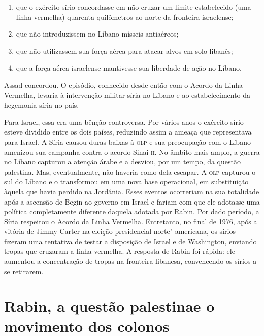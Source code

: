 \begin{enumerate}
\def\labelenumi{\arabic{enumi}.}
\item
  que o exército sírio concordasse em não cruzar um limite estabelecido
  (uma linha vermelha) quarenta quilômetros ao norte da fronteira
  israelense;
\item
  que não introduzissem no Líbano mísseis antiaéreos;
\item
  que não utilizassem sua força aérea para atacar alvos em solo
  libanês;
\item
  que a força aérea israelense mantivesse sua liberdade de ação no
  Líbano.
\end{enumerate}

Assad concordou. O episódio, conhecido desde então com o Acordo da Linha
Vermelha,
levaria à intervenção militar síria no Líbano e ao estabelecimento da
hegemonia síria no país.

Para Israel, essa era uma bênção controversa. Por vários anos o exército sírio
esteve dividido entre os dois países, reduzindo assim a ameaça que
representava para Israel. A Síria causou duras baixas à \textsc{olp} e sua
preocupação com o Líbano amenizou sua campanha contra o acordo Sinai \textsc{ii}.
No âmbito mais amplo, a guerra no Líbano capturou a atenção árabe e a
desviou, por um tempo, da questão palestina. Mas, eventualmente, não
haveria como dela escapar. A \textsc{olp} capturou o sul do Líbano e o
transformou em uma nova base operacional, em substituição àquela que
havia perdido na Jordânia. Esses eventos ocorreriam na sua totalidade
após a ascensão de Begin ao governo em Israel e fariam com que ele
adotasse uma política completamente diferente daquela adotada por Rabin.
Por dado período, a Síria respeitou o Acordo da Linha Vermelha. Entretanto, no
final de 1976, após a vitória de Jimmy Carter na eleição presidencial
norte"-americana, os sírios fizeram uma tentativa de testar a disposição
de Israel e de Washington, enviando tropas que cruzaram a linha
vermelha. A resposta de Rabin foi rápida: ele aumentou a concentração de
tropas na fronteira libanesa, convencendo os sírios a se
retirarem.

\section{Rabin, a questão palestina\break e o movimento dos colonos}

